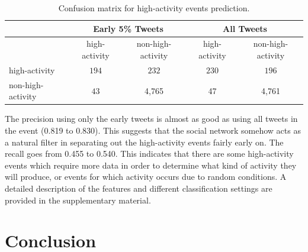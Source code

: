 \begin{table}[!htb]
  \centering
  \begin{tabularx}{\textwidth}{lcc|cc}
    \toprule
    \multirow{2}{*}{ }& \multicolumn{2}{c}{\textbf{Early 5\% Tweets}} & \multicolumn{2}{c}{\textbf{All Tweets}} \\
    \midrule
    & high-activity & non-high-activity & high-activity & non-high-activity \\
    high-activity & $194$ & $232$ & $230$ & $196$\\
    non-high-activity & $43$ & 4,765 & 47 & 4,761 \\
    \bottomrule
  \end{tabularx}
  \caption[Confusion matrix for high-activity event prediction]{{Confusion matrix for high-activity events prediction.}}
  \label{tab:confusion_matrix}
\end{table}



The precision using only the early tweets is almost as good as using
all tweets in the event (0.819 to 0.830). This suggests that the
social network somehow acts as a natural filter in separating out the
high-activity events fairly early on.  The recall goes from 0.455 to
0.540. This indicates that there are some high-activity events which
require more data in order to determine what kind of activity they will
produce, or events for which activity occurs due to random conditions. A
detailed description of the features and different classification
settings are provided in the supplementary material.%




\section{Conclusion}

